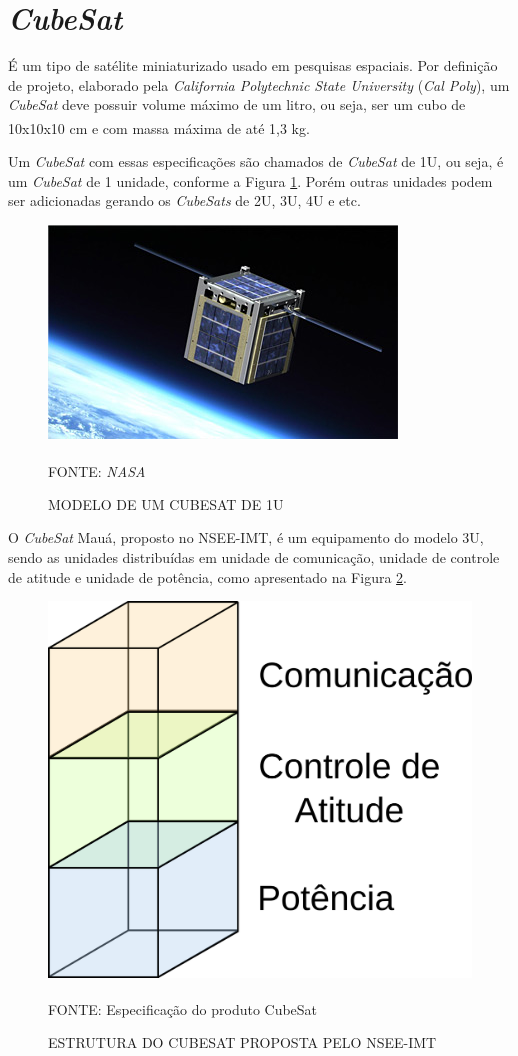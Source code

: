 \documentclass[
	12pt,				%
	openright,			%
	oneside,			%
	a4paper,			%
	english,			%
	french,				%
	spanish,			%
	brazil,				%
	oldfontcommands
	]{abntex2}
\begin{document}
\section[CubeSat]{\textit{CubeSat}}

	É um tipo de satélite miniaturizado usado em pesquisas espaciais. Por definição de projeto, elaborado pela \textit{California Polytechnic State University} (\textit{Cal Poly}), um \textit{CubeSat} deve possuir volume máximo de um litro, ou seja, ser um cubo de 10x10x10 cm e com massa máxima de até 1,3 kg.\textsuperscript{\cite{CubeSat}}
	
	Um \textit{CubeSat} com essas especificações são chamados de \textit{CubeSat} de 1U, ou seja, é um \textit{CubeSat} de 1 unidade, conforme a Figura \ref{Fig_Cubo}. Porém outras unidades podem ser adicionadas gerando os \textit{CubeSats} de 2U, 3U, 4U e etc.
	
	\begin{figure}[th]
		\caption{MODELO DE UM CUBESAT DE 1U}
		\label{Fig_Cubo}
		\centering
		\includegraphics[width=0.8\linewidth]{./figs/cubesat_01}
			
		\begin{small}
			FONTE: \textit{NASA}\textsuperscript{\cite{NASA}}
		\end{small}		
	\end{figure}
		
	O \textit{CubeSat} Mauá, proposto no NSEE-IMT, é um equipamento do modelo 3U, sendo as unidades distribuídas em unidade de comunicação, unidade de controle de atitude e unidade de potência, como apresentado na Figura \ref{Fig_Est_Cubo}.
	
	\begin{figure}[th]
		\caption{ESTRUTURA DO CUBESAT PROPOSTA PELO NSEE-IMT}
		\label{Fig_Est_Cubo}
		\centering
		\includegraphics[width=0.4\linewidth]{./figs/cubesat_02}
			
		\begin{small}
			FONTE: Especificação do produto CubeSat\textsuperscript{\cite{Corsi}}
		\end{small}		
	\end{figure}
	\pagebreak
\end{document}
